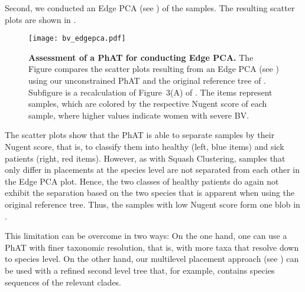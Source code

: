 Second, we conducted an Edge PCA \citep{Matsen2011a}
(see )
of the samples.
The resulting scatter plots are shown in .

\begin{figure}[hpbt]
    \centering
    \texttt{[image: bv\_edgepca.pdf]}
    \begin{subfigure}{0pt}
        \label{fig:bv_edgepca:sub:edgepca_art}
    \end{subfigure}
    \begin{subfigure}{0pt}
        \label{fig:bv_edgepca:sub:edgepca_orig}
    \end{subfigure}
    \caption[Assessment of a \acs{PhAT} for conducting Edge PCA]{
        \textbf{Assessment of a \acs{PhAT} for conducting Edge PCA.}
        The Figure compares the scatter plots resulting from an Edge PCA
        (see )
        using  our unconstrained  \acs{PhAT} and
         the original reference tree of .
        Subfigure  is a recalculation of Figure~3(A) of \cite{Srinivasan2012}.
        The items represent samples, which are colored by the respective Nugent score of each sample,
        where higher values indicate women with severe \acl{BV}.
    }
    \label{fig:bv_edgepca}
\end{figure}

The scatter plots show that the \ac{PhAT} is able to separate samples by their Nugent score, that is, to classify them
into healthy (left, blue items) and sick patients (right, red items).
However, as with Squash Clustering, samples that only differ in placements at the species level
are not separated from each other in the Edge PCA plot.
Hence, the two classes of healthy patients do again not exhibit
the separation based on the two  species that is apparent when using the original reference tree.
Thus, the samples with low Nugent score form one blob in .

This limitation can be overcome in two ways:
On the one hand, one can use a \ac{PhAT} with finer taxonomic resolution,
that is, with more taxa that resolve down to species level.
On the other hand, our multilevel placement approach (see )
can be used with a refined second level tree that, 
for example, contains species sequences of the relevant  clades.

